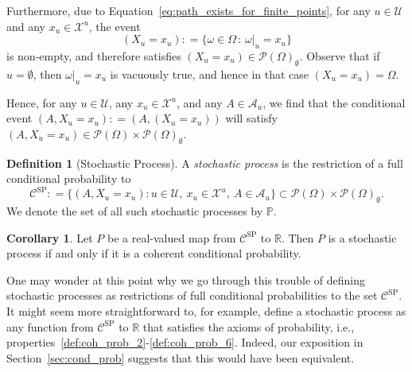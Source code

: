 \documentclass[10pt,a4paper]{paper}
\theoremstyle{definition}
\newtheorem{corollary}[theorem]{Corollary}
\newtheorem{definition}{Definition}
\newcommand{\reals}{\mathbb{R}}
\newcommand{\states}{\mathcal{X}}
\newcommand{\paths}{\Omega}
\newcommand{\power}{\mathcal{P}(\paths)}
\newcommand{\nonemptypower}{\power_{\emptyset}}
\newcommand{\processes}{\mathbb{P}}
\newcommand{\coloneqq}{:\!=}
\begin{document}
Furthermore, due to Equation~\eqref{eq:path_exists_for_finite_points}, for any $u\in\mathcal{U}$ and any $x_u\in\states^u$, the event
\begin{equation*}
(X_u=x_u) \coloneqq \{\omega\in\Omega\,:\,\omega\vert_u=x_u\}
\end{equation*}
is non-empty, and therefore satisfies $(X_u=x_u)\in\nonemptypower$. Observe that if $u=\emptyset$, then $\omega\vert_u=x_u$ is vacuously true, and hence in that case $(X_u=x_u)=\Omega$.

Hence, for any $u\in\mathcal{U}$, any $x_u\in\states^u$, and any $A\in\mathcal{A}_u$, we find that the conditional event $(A,X_u=x_u)\coloneqq (A,(X_u=x_u))$ will satisfy $(A,X_u=x_u)\in\power\times\nonemptypower$.

\begin{definition}[Stochastic Process]\label{def:stoch_process}
A \emph{stochastic process} is the restriction of a full conditional probability to
\begin{equation*}
\mathcal{C}^\mathrm{SP}\coloneqq\big\{
(A,X_u=x_u)
\colon
u\in\mathcal{U},~x_u\in\states^u,~A\in\mathcal{A}_u\big\}\subset\power\times\nonemptypower.
\end{equation*}
We denote the set of all such stochastic processes by $\processes$.
\end{definition}

\begin{corollary}\label{corol:processiffcoherent}
Let $P$ be a real-valued map from $\mathcal{C}^\mathrm{SP}$ to $\reals$. Then $P$ is a stochastic process if and only if it is a coherent conditional probability.
\end{corollary}

One may wonder at this point why we go through this trouble of defining stochastic processes as restrictions of full conditional probabilities to the set $\mathcal{C}^\mathrm{SP}$. It might seem more straightforward to, for example, define a stochastic process as any function from $\mathcal{C}^\mathrm{SP}$ to $\reals$ that satisfies the axioms of probability, i.e., properties~\ref{def:coh_prob_2}-\ref{def:coh_prob_6}. Indeed, our exposition in Section~\ref{sec:cond_prob} suggests that this would have been equivalent.
\end{document}
